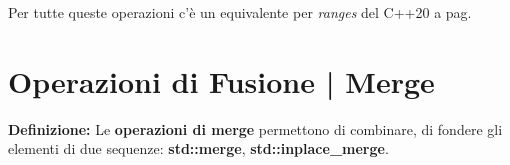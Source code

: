 \fleuron

\textsf{\small Per tutte queste operazioni c'è un equivalente per \emph{ranges} del C++20 a pag. \pageref{ranges_binary_search}} \\




\newpage

\section{Operazioni di Fusione | Merge}

\textsf{\small \textbf{Definizione: } Le \textbf{operazioni di merge} permettono di combinare, di fondere gli elementi di due sequenze: \textbf{std::merge}, \textbf{std::inplace\_merge}.} \\

